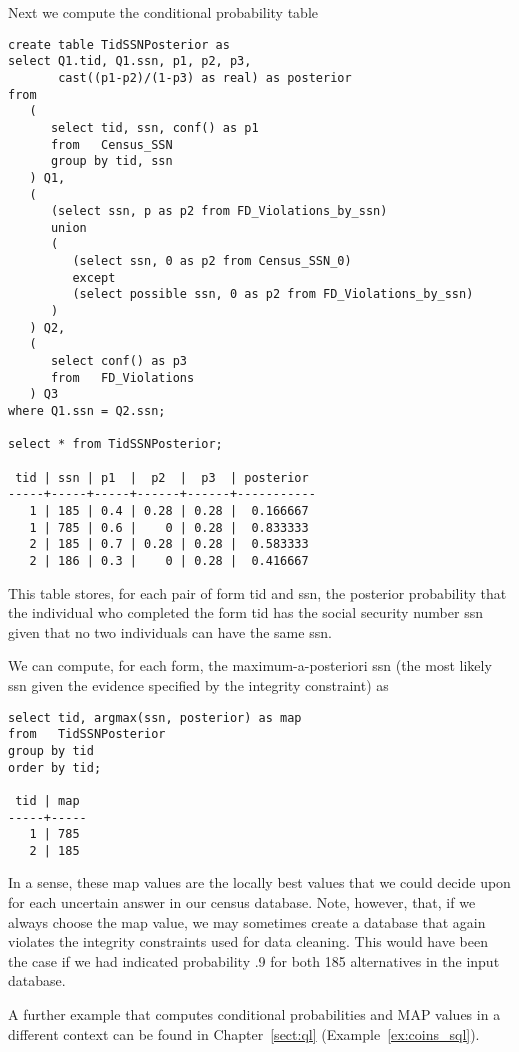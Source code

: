 Next we compute the conditional probability table
\begin{verbatim}
create table TidSSNPosterior as
select Q1.tid, Q1.ssn, p1, p2, p3,
       cast((p1-p2)/(1-p3) as real) as posterior
from
   (
      select tid, ssn, conf() as p1
      from   Census_SSN
      group by tid, ssn
   ) Q1,
   (
      (select ssn, p as p2 from FD_Violations_by_ssn)
      union
      (
         (select ssn, 0 as p2 from Census_SSN_0)
         except
         (select possible ssn, 0 as p2 from FD_Violations_by_ssn)
      )
   ) Q2,
   (
      select conf() as p3
      from   FD_Violations
   ) Q3
where Q1.ssn = Q2.ssn;

select * from TidSSNPosterior;

 tid | ssn | p1  |  p2  |  p3  | posterior
-----+-----+-----+------+------+-----------
   1 | 185 | 0.4 | 0.28 | 0.28 |  0.166667
   1 | 785 | 0.6 |    0 | 0.28 |  0.833333
   2 | 185 | 0.7 | 0.28 | 0.28 |  0.583333
   2 | 186 | 0.3 |    0 | 0.28 |  0.416667
\end{verbatim}

This table stores, for each pair of form tid and ssn, the posterior probability
that the individual who completed the form tid has the social security number
ssn given that no two individuals can have the same ssn.

We can compute, for each form, the maximum-a-posteriori ssn (the most likely
ssn given the evidence specified by the integrity constraint) as
\begin{verbatim}
select tid, argmax(ssn, posterior) as map
from   TidSSNPosterior
group by tid
order by tid;

 tid | map
-----+-----
   1 | 785
   2 | 185
\end{verbatim}

In a sense, these map values are the locally best values that we could decide
upon for each uncertain answer in our census database. Note, however, that,
if we always choose the map value, we may sometimes create a database that
again violates the integrity constraints used for data cleaning.
This would have been the case if we had indicated probability .9 for both
185 alternatives in the input database.




A further example that computes conditional probabilities and MAP values
in a different context can be
found in Chapter~\ref{sect:ql} (Example~\ref{ex:coins_sql}).




